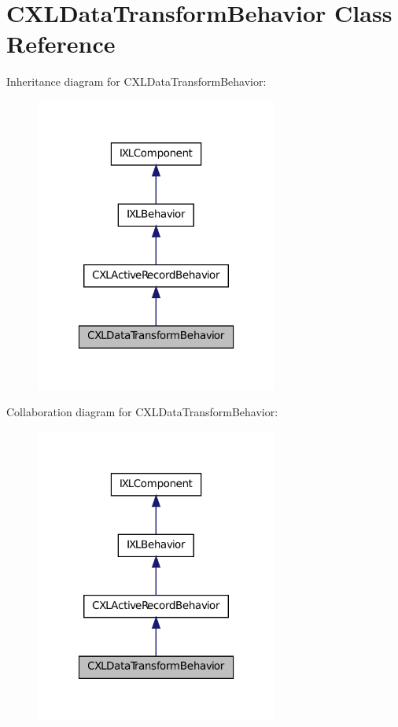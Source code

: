 \hypertarget{classCXLDataTransformBehavior}{
\section{CXLDataTransformBehavior Class Reference}
\label{classCXLDataTransformBehavior}
}


Inheritance diagram for CXLDataTransformBehavior:\nopagebreak
\begin{figure}[H]
\begin{center}
\leavevmode
\includegraphics[width=226pt]{classCXLDataTransformBehavior__inherit__graph}
\end{center}
\end{figure}


Collaboration diagram for CXLDataTransformBehavior:\nopagebreak
\begin{figure}[H]
\begin{center}
\leavevmode
\includegraphics[width=226pt]{classCXLDataTransformBehavior__coll__graph}
\end{center}
\end{figure}

